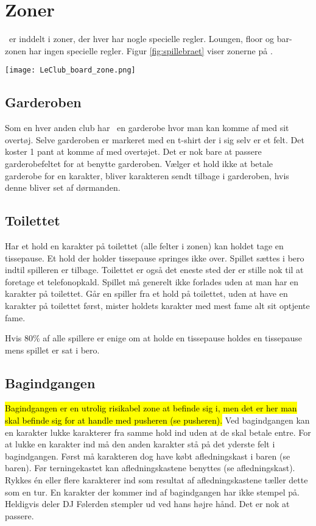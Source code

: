 \section{Zoner}
\LeClub\ er inddelt i zoner, der hver har nogle specielle regler. Loungen, floor og bar-zonen har ingen specielle regler. Figur \ref{fig:spillebraet} viser zonerne på \LeClub .

\begin{Figure}
\centering
\texttt{[image: LeClub\_board\_zone.png]}
\label{fig:spillebraet}
\end{Figure}

\subsection{Garderoben}
Som en hver anden club har \LeClub\ en garderobe hvor man kan komme af med sit overtøj. Selve garderoben er markeret med en t-shirt der i sig selv er et felt. Det koster 1 pant at komme af med overtøjet. Det er nok bare at passere garderobefeltet for at benytte garderoben. Vælger et hold ikke at betale garderobe for en karakter, bliver karakteren sendt tilbage i garderoben, hvis denne bliver set af dørmanden. 

\subsection{Toilettet}
Har et hold en karakter på toilettet (alle felter i zonen) kan holdet tage en tissepause. Et hold der holder tissepause springes ikke over. Spillet sættes i bero indtil spilleren er tilbage. Toilettet er også det eneste sted der er stille nok til at foretage et telefonopkald. Spillet må generelt ikke forlades uden at man har en karakter på toilettet. Går en spiller fra et hold på toilettet, uden at have en karakter på toilettet først, mister holdets karakter med mest fame alt sit optjente fame. 

Hvis 80\% af alle spillere er enige om at holde en tissepause holdes en tissepause mens spillet er sat i bero. 

\subsection{Bagindgangen}
\hl{Bagindgangen er en utrolig risikabel zone at befinde sig i, men det er her man skal befinde sig for at handle med pusheren (se pusheren).}
Ved bagindgangen kan en karakter lukke karakterer fra samme hold ind uden at de skal betale entre. For at lukke en karakter ind må den anden karakter stå på det yderste felt i bagindgangen. Først må karakteren dog have købt afledningskast i baren (se baren). Før terningekastet kan afledningskastene benyttes (se afledningskast). Rykkes én eller flere karakterer ind som resultat af afledningskastene tæller dette som en tur. En karakter der kommer ind af bagindgangen har ikke stempel på. Heldigvis deler DJ Følerden stempler ud ved hans højre hånd. Det er nok at passere. 

